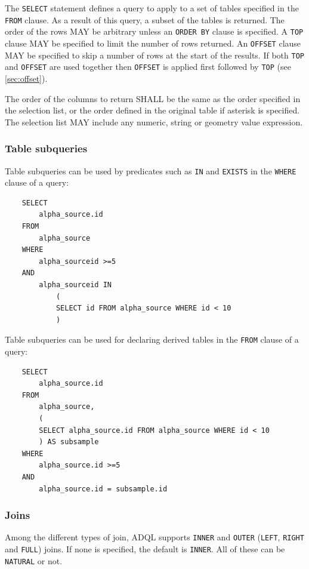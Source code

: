 \documentclass[11pt,a4paper]{ivoa}
\begin{document}
The \verb:SELECT: statement defines a query to apply to a set of tables specified
in the \verb:FROM: clause. As a result of this query, a subset of the tables
is returned.
The order of the rows MAY be arbitrary unless an \verb:ORDER BY: clause is specified.
A \verb:TOP: clause MAY be specified to limit the number of rows returned. 
An \verb:OFFSET: clause MAY be specified to skip a number of rows at the start
of the results.
If both \verb:TOP: and \verb:OFFSET: are used together then \verb:OFFSET: is applied
first followed by \verb:TOP: (see \ref{sec:offset}). 

The order of the columns to return SHALL be the same as the
order specified in the selection list, or the order defined in the original
table if asterisk is specified. The selection list MAY include any numeric,
string or geometry value expression.

\subsubsection{Table subqueries}
\label{sec:subqueries}

Table subqueries can be used by predicates such as \verb:IN: and \verb:EXISTS:
in the \verb:WHERE: clause of a query:

\begin{verbatim}
    SELECT
        alpha_source.id
    FROM 
        alpha_source
    WHERE
        alpha_sourceid >=5
    AND
        alpha_sourceid IN 
            (
            SELECT id FROM alpha_source WHERE id < 10
            )
\end{verbatim}

Table subqueries can be used for declaring derived tables in the \verb:FROM: clause
of a query:

\begin{verbatim}
    SELECT
        alpha_source.id
    FROM
        alpha_source,
        (
        SELECT alpha_source.id FROM alpha_source WHERE id < 10
        ) AS subsample
    WHERE
        alpha_source.id >=5
    AND
        alpha_source.id = subsample.id
\end{verbatim}

\subsubsection{Joins}
\label{sec:joins}

Among the different types of join, ADQL supports \verb:INNER: and \verb:OUTER:
(\verb:LEFT:, \verb:RIGHT: and \verb:FULL:) joins. If none is specified, the
default is \verb:INNER:. All of these can be \verb:NATURAL: or not.
\end{document}
